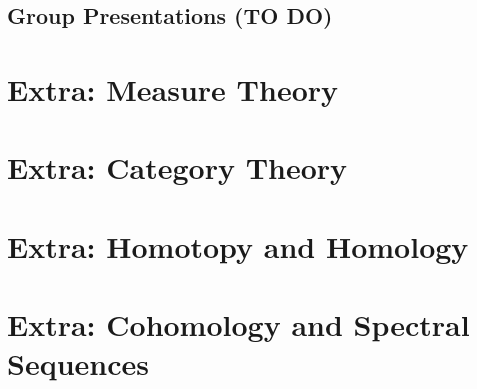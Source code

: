 \documentclass[11pt]{article}
\begin{document}


\subsection{Group Presentations (TO DO)}





\newpage
\section{Extra: Measure Theory}

\newpage
\section{Extra: Category Theory}


\newpage
\section{Extra: Homotopy and Homology}


\newpage
\section{Extra: Cohomology and Spectral Sequences}





\newpage
\vskip 0.5cm
\end{document}
